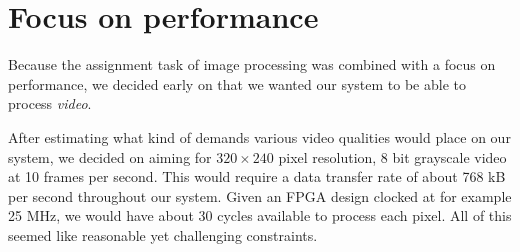 \section{Focus on performance}

Because the assignment task of image processing was combined with a
focus on performance, we decided early on that we wanted our system to
be able to process \emph{video}.

After estimating what kind of demands various video qualities would
place on our system, we decided on aiming for $320\times240$ pixel
resolution, 8 bit grayscale video at 10 frames per second. This would
require a data transfer rate of about 768 kB per second throughout our
system. Given an FPGA design clocked at for example 25 MHz, we would
have about 30 cycles available to process each pixel. All of this seemed
like reasonable yet challenging constraints.
